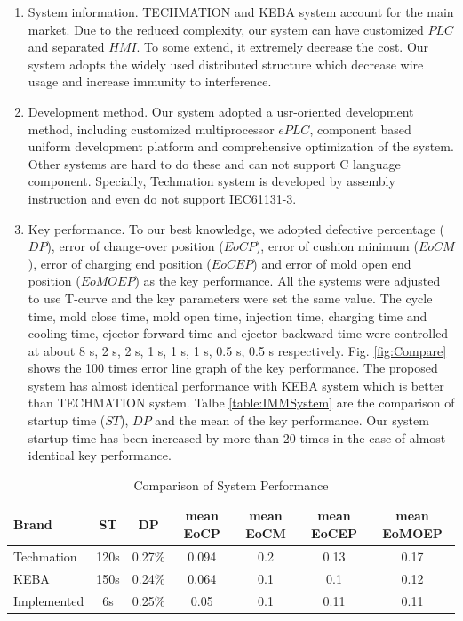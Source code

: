\documentclass[journal,UTF8]{IEEEtran}
\begin{document}
\begin{enumerate}
	\item System information. TECHMATION and KEBA system account for the main market. Due to the reduced complexity, our system can have customized $PLC$ and separated $HMI$. To some extend, it extremely decrease the cost. Our system adopts the widely used distributed structure which decrease wire usage and increase immunity to interference.
	\item Development method. Our system adopted a usr-oriented development method, including customized multiprocessor $ePLC$, component based uniform development platform and comprehensive optimization of the system. Other systems are hard to do these and can not support C language component. Specially, Techmation system is developed by assembly instruction and even do not support IEC61131-3.
	\item Key performance. To our best knowledge, we adopted defective percentage ($DP$), error of change-over position ($EoCP$), error of cushion minimum ($EoCM$), error of charging end position ($EoCEP$) and error of mold open end position ($EoMOEP$) as the key performance. All the systems were adjusted to use T-curve and the key parameters were set the same value. The cycle time, mold close time, mold open time, injection time, charging time and cooling time, ejector forward time and ejector backward time were controlled at about 8 s, 2 s, 2 s, 1 s, 1 s, 1 s, 0.5 s, 0.5 s respectively. Fig. \ref{fig:Compare} shows the 100 times error line graph of the key performance. The proposed system has almost identical performance with KEBA system which is better than TECHMATION system. Talbe \ref{table:IMMSystem} are the comparison of startup time ($ST$), $DP$ and the mean of the key performance. Our system startup time has been increased by more than 20 times in the case of almost identical key performance.
\end{enumerate}
\begin{table}
	\scriptsize \caption{Comparison of System Performance}
	\label{table:ComparisonG}
	\begin{center}
		\renewcommand{\arraystretch}{1.4}
		\setlength\tabcolsep{3pt}
		\begin{tabular}{|l|c|c|c|c|c|c|}
			\hline
			Brand & ST &DP&mean EoCP&mean EoCM&mean EoCEP&mean EoMOEP\\
			\hline
			Techmation  & 120s  &0.27\% &0.094 & 0.2 & 0.13 & 0.17 \\
			\hline
			KEBA        & 150s  &0.24\% &0.064 & 0.1 & 0.1 & 0.12 \\
			\hline
			Implemented   & 6s     &0.25\% &0.05 & 0.1 & 0.11 & 0.11\\
			\hline
		\end{tabular}
	\end{center}
\end{table}
\end{document}
